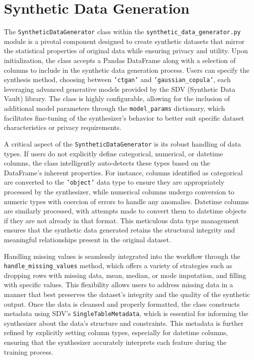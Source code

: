 \documentclass{article}
\begin{document}
\section*{Synthetic Data Generation}
The \texttt{SyntheticDataGenerator} class within the \texttt{synthetic\_data\_generator.py} module is a pivotal component designed to create synthetic datasets that mirror the statistical properties of original data while ensuring privacy and utility. Upon initialization, the class accepts a Pandas DataFrame along with a selection of columns to include in the synthetic data generation process. Users can specify the synthesis method, choosing between \texttt{'ctgan'} and \texttt{'gaussian\_copula'}, each leveraging advanced generative models provided by the SDV (Synthetic Data Vault) library. The class is highly configurable, allowing for the inclusion of additional model parameters through the \texttt{model\_params} dictionary, which facilitates fine-tuning of the synthesizer's behavior to better suit specific dataset characteristics or privacy requirements.

A critical aspect of the \texttt{SyntheticDataGenerator} is its robust handling of data types. If users do not explicitly define categorical, numerical, or datetime columns, the class intelligently auto-detects these types based on the DataFrame's inherent properties. For instance, columns identified as categorical are converted to the \texttt{'object'} data type to ensure they are appropriately processed by the synthesizer, while numerical columns undergo conversion to numeric types with coercion of errors to handle any anomalies. Datetime columns are similarly processed, with attempts made to convert them to datetime objects if they are not already in that format. This meticulous data type management ensures that the synthetic data generated retains the structural integrity and meaningful relationships present in the original dataset.

Handling missing values is seamlessly integrated into the workflow through the \texttt{handle\_missing\_values} method, which offers a variety of strategies such as dropping rows with missing data, mean, median, or mode imputation, and filling with specific values. This flexibility allows users to address missing data in a manner that best preserves the dataset's integrity and the quality of the synthetic output. Once the data is cleansed and properly formatted, the class constructs metadata using SDV's \texttt{SingleTableMetadata}, which is essential for informing the synthesizer about the data's structure and constraints. This metadata is further refined by explicitly setting column types, especially for datetime columns, ensuring that the synthesizer accurately interprets each feature during the training process.
\end{document}
